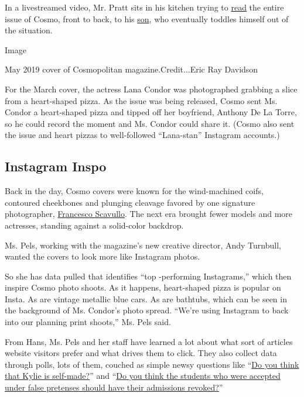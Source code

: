 In a livestreamed video, Mr. Pratt sits in his kitchen trying to
\href{https://www.youtube.com/watch?v=l-dnrweE4sA}{read} the entire
issue of Cosmo, front to back, to his
\href{https://www.youtube.com/watch?v=l-dnrweE4sA}{son}, who eventually
toddles himself out of the situation.

Image

May 2019 cover of Cosmopolitan magazine.Credit...Eric Ray Davidson

For the March cover, the actress Lana Condor was photographed grabbing a
slice from a heart-shaped pizza. As the issue was being released, Cosmo
sent Ms. Condor a heart-shaped pizza and tipped off her boyfriend,
Anthony De La Torre, so he could record the moment and Ms. Condor could
share it. (Cosmo also sent the issue and heart pizzas to well-followed
``Lana-stan'' Instagram accounts.)

\hypertarget{instagram-inspo}{%
\subsection{Instagram Inspo}\label{instagram-inspo}}

Back in the day, Cosmo covers were known for the wind-machined coifs,
contoured cheekbones and plunging cleavage favored by one signature
photographer,
\href{https://www.nytimes3xbfgragh.onion/2004/01/07/arts/francesco-scavullo-fashion-photographer-dies-at-82.html}{Francesco
Scavullo}. The next era brought fewer models and more actresses,
standing against a solid-color backdrop.

Ms. Pels, working with the magazine's new creative director, Andy
Turnbull, wanted the covers to look more like Instagram photos.

So she has data pulled that identifies ``top -performing Instagrams,''
which then inspire Cosmo photo shoots. As it happens, heart-shaped pizza
is popular on Insta. As are vintage metallic blue cars. As are bathtubs,
which can be seen in the background of Ms. Condor's photo spread.
``We're using Instagram to back into our planning print shoots,'' Ms.
Pels said.

From Hans, Ms. Pels and her staff have learned a lot about what sort of
articles website visitors prefer and what drives them to click. They
also collect data through polls, lots of them, couched as simple newsy
questions like
``\href{https://www.cosmopolitan.com/entertainment/a26998326/kylie-jenner-admits-not-self-made-billionaire/}{Do
you think that Kylie is self-made?}'' and
``\href{https://www.cosmopolitan.com/entertainment/celebs/a26930204/yale-rescinds-admission-student-college-bribery-scandal/}{Do
you think the students who were accepted under false pretenses should
have their admissions revoked?}''

